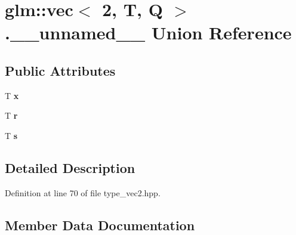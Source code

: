 \hypertarget{unionglm_1_1vec_3_012_00_01T_00_01Q_01_4_8____unnamed____}{}\section{glm\+:\+:vec$<$ 2, T, Q $>$.\+\_\+\+\_\+unnamed\+\_\+\+\_\+ Union Reference}
\label{unionglm_1_1vec_3_012_00_01T_00_01Q_01_4_8____unnamed____}
\subsection*{Public Attributes}
\begin{DoxyCompactItemize}
\item 
\mbox{\label{unionglm_1_1vec_3_012_00_01T_00_01Q_01_4_8____unnamed_____a9dd4e461268c8034f5c8564e155c67a6}} 
T {\bfseries x}
\item 
\mbox{\label{unionglm_1_1vec_3_012_00_01T_00_01Q_01_4_8____unnamed_____a4b43b0aee35624cd95b910189b3dc231}} 
T {\bfseries r}
\item 
\mbox{\label{unionglm_1_1vec_3_012_00_01T_00_01Q_01_4_8____unnamed_____a03c7c0ace395d80182db07ae2c30f034}} 
T {\bfseries s}
\end{DoxyCompactItemize}


\subsection{Detailed Description}


Definition at line 70 of file type\+\_\+vec2.\+hpp.



\subsection{Member Data Documentation}
\mbox{\label{unionglm_1_1vec_3_012_00_01T_00_01Q_01_4_8____unnamed_____a4b43b0aee35624cd95b910189b3dc231}} 
